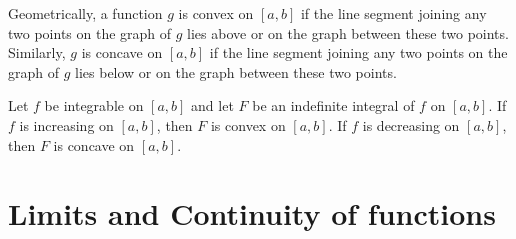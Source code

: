 \documentclass[a4paper]{ctexart}
\begin{document}
	\begin{myrmk}
		Geometrically, a function $g$ is convex on $[a,b]$ if the line segment joining any two points on the graph of $g$ lies above or on the graph between these two points. Similarly, $g$ is concave on $[a,b]$ if the line segment joining any two points on the graph of $g$ lies below or on the graph between these two points.
	\end{myrmk}
	\begin{mythm}
		Let $f$ be integrable on $[a,b]$ and let $F$ be an indefinite integral of $f$ on $[a,b]$. If $f$ is increasing on $[a,b]$, then $F$ is convex on $[a,b]$. If $f$ is decreasing on $[a,b]$, then $F$ is concave on $[a,b]$.
	\end{mythm}





	\newpage

	\section{Limits and Continuity of functions}
\end{document}
